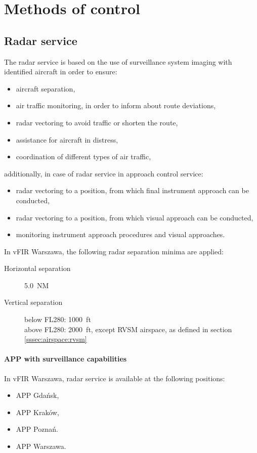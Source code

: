 \chapter{Methods of control}

\section{Radar service}

The radar service is based on the use of surveillance system imaging with identified aircraft in order to ensure:
\begin{itemize}
    \item aircraft separation,
    \item air traffic monitoring, in order to inform about route deviations,
    \item radar vectoring to avoid traffic or shorten the route,
    \item assistance for aircraft in distress,
    \item coordination of different types of air traffic,
\end{itemize}
additionally, in case of radar service in approach control service:
\begin{itemize}
    \item radar vectoring to a position, from which final instrument approach can be conducted,
    \item radar vectoring to a position, from which visual approach can be conducted,
    \item monitoring instrument approach procedures and visual approaches.
\end{itemize}

In vFIR Warszawa, the following radar separation minima are applied:
\begin{description}
    \item[Horizontal separation] 5.0~NM
    \item[Vertical separation]\parbox[t]{0.8\textwidth}{
              below FL280: 1000~ft\\
              above FL280: 2000~ft, except RVSM airspace, as defined in section \ref{sssec:airspace:rvsm}}
\end{description}

\subsubsection{APP with surveillance capabilities}
In vFIR Warszawa, radar service is available at the following positions:
\begin{itemize}
    \item APP Gdańsk,
    \item APP Kraków,
    \item APP Poznań.
    \item APP Warszawa.
\end{itemize}


